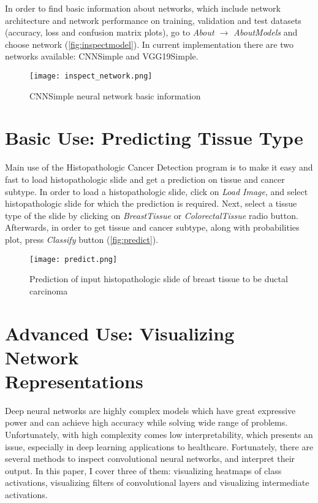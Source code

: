 In order to find basic information about networks, which include network architecture and network performance on training, validation and test datasets (accuracy, loss and confusion matrix plots), go to \emph{About $\rightarrow$ About\;Models} and choose network (\textcolor{red}{\autoref{fig:inspectmodel}}). In current implementation there are two networks available: CNNSimple and VGG19Simple.
\clearpage

\begin{figure}[h]
	\centering
	\texttt{[image: inspect\_network.png]}
	\caption{CNNSimple neural network basic information}
	\label{fig:inspectmodel}
\end{figure}

\section{Basic Use: Predicting Tissue Type}
\label{basicuse}

Main use of the Histopathologic Cancer Detection program is to make it easy and fast to load histopathologic slide and get a prediction on tissue and cancer subtype. In order to load a histopathologic slide, click on \emph{Load\; Image}, and select histopathologic slide for which the prediction is required. Next, select a tissue type of the slide by clicking on \emph{Breast\;Tissue} or \emph{Colorectal\;Tissue} radio button. Afterwards, in order to get tissue and cancer subtype, along with probabilities plot, press \emph{Classify} button (\textcolor{red}{\autoref{fig:predict}}).

\begin{figure}[h]
	\centering
	\texttt{[image: predict.png]}
	\caption{Prediction of input histopathologic slide of breast tissue to be ductal carcinoma}
	\label{fig:predict}
\end{figure}

\section{Advanced Use: Visualizing Network \\Representations}
\label{advuse}

Deep neural networks are highly complex models which have great expressive power and can achieve high accuracy while solving wide range of problems. Unfortunately, with high complexity comes low interpretability, which presents an issue, especially in deep learning applications to healthcare. Fortunately, there are several methods to inspect convolutional neural networks, and interpret their output. In this paper, I cover three of them: visualizing heatmaps of class activations, visualizing filters of convolutional layers and visualizing intermediate activations.

